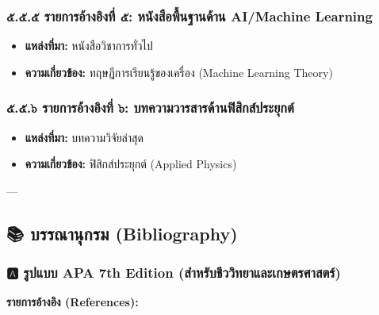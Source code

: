 \documentclass[11pt,a4paper,openany]{report}
\begin{document}
\subsubsection{๕.๕.๕ รายการอ้างอิงที่ ๕: หนังสือพื้นฐานด้าน AI/Machine Learning}

\begin{itemize}
  \item \textbf{แหล่งที่มา:} หนังสือวิชาการทั่วไป
  \item \textbf{ความเกี่ยวข้อง:} ทฤษฎีการเรียนรู้ของเครื่อง (Machine Learning Theory)
\end{itemize}


\subsubsection{๕.๕.๖ รายการอ้างอิงที่ ๖: บทความวารสารด้านฟิสิกส์ประยุกต์}

\begin{itemize}
  \item \textbf{แหล่งที่มา:} บทความวิจัยล่าสุด
  \item \textbf{ความเกี่ยวข้อง:} ฟิสิกส์ประยุกต์ (Applied Physics)
\end{itemize}


---

\subsection{📚 บรรณานุกรม (Bibliography)}


\subsubsection{🅰️ รูปแบบ APA 7th Edition (สำหรับชีววิทยาและเกษตรศาสตร์)}


\textbf{รายการอ้างอิง (References):}
\end{document}
